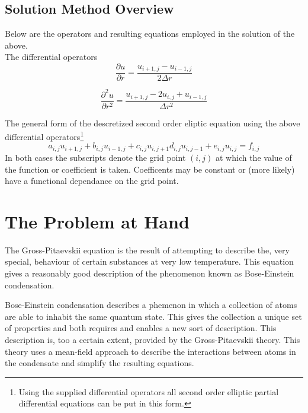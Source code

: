 \documentclass{article}
\begin{document}
\subsection{Solution Method Overview}
Below are the operators and resulting equations employed in the solution of the above.\\

The differential operators
\begin{equation}
\frac{\partial u}{\partial r} = \frac{u_{i+1, j} - u_{i-1, j}}{2\Delta r}
\end{equation}

\begin{equation}
\frac{\partial^{2} u}{\partial r^{2}} =
\frac{u_{i+1,j} - 2 u_{i,j} +u_{i-1,j}}{\Delta r^{2}}
\end{equation}

The general form of the descretized second order eliptic equation using the
above differential operators\footnote{Using the supplied differential operators
all second order elliptic partial differential equations can be put in this
form.}
\begin{equation}
a_{i,j} u_{i+1, j} + b_{i,j} u_{i-1, j} + c_{i,j} u_{i, j+1} d_{i,j} u_{i, j-1}
+ e_{i,j} u_{i, j} = f_{i,j}
\end{equation}
In both cases the subscripts denote the grid point $(i,j)$ at which the value of the
function or coefficient is taken. Coefficents may be constant or (more likely)
have a functional dependance on the grid point. \cite{3}

\section{The Problem at Hand}

The Gross-Pitaevskii equation is the result of attempting to describe the,
very special, behaviour of certain substances at very low temperature. This
equation gives a reasonably good description of the phenomenon known as
Bose-Einstein condensation.


Bose-Einstein condensation describes a phemenon in which a collection of
atoms are able to inhabit the same quantum state. This gives the collection
a unique set of properties and both requires and enables a new sort of
description.\cite{8} This description is, too a certain extent, provided by
the Gross-Pitaevskii theory. This theory uses a mean-field approach to
describe the interactions between atoms in the condensate and simplify
the resulting equations.\cite{6}
\end{document}
